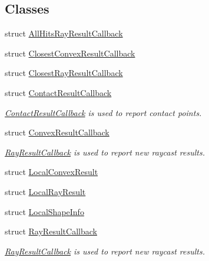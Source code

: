 \subsection*{Classes}
\begin{DoxyCompactItemize}
\item 
struct \hyperlink{structbtCollisionWorld_1_1AllHitsRayResultCallback}{All\+Hits\+Ray\+Result\+Callback}
\item 
struct \hyperlink{structbtCollisionWorld_1_1ClosestConvexResultCallback}{Closest\+Convex\+Result\+Callback}
\item 
struct \hyperlink{structbtCollisionWorld_1_1ClosestRayResultCallback}{Closest\+Ray\+Result\+Callback}
\item 
struct \hyperlink{structbtCollisionWorld_1_1ContactResultCallback}{Contact\+Result\+Callback}
\begin{DoxyCompactList}\small\item\em \hyperlink{structbtCollisionWorld_1_1ContactResultCallback}{Contact\+Result\+Callback} is used to report contact points. \end{DoxyCompactList}\item 
struct \hyperlink{structbtCollisionWorld_1_1ConvexResultCallback}{Convex\+Result\+Callback}
\begin{DoxyCompactList}\small\item\em \hyperlink{structbtCollisionWorld_1_1RayResultCallback}{Ray\+Result\+Callback} is used to report new raycast results. \end{DoxyCompactList}\item 
struct \hyperlink{structbtCollisionWorld_1_1LocalConvexResult}{Local\+Convex\+Result}
\item 
struct \hyperlink{structbtCollisionWorld_1_1LocalRayResult}{Local\+Ray\+Result}
\item 
struct \hyperlink{structbtCollisionWorld_1_1LocalShapeInfo}{Local\+Shape\+Info}
\item 
struct \hyperlink{structbtCollisionWorld_1_1RayResultCallback}{Ray\+Result\+Callback}
\begin{DoxyCompactList}\small\item\em \hyperlink{structbtCollisionWorld_1_1RayResultCallback}{Ray\+Result\+Callback} is used to report new raycast results. \end{DoxyCompactList}\end{DoxyCompactItemize}
